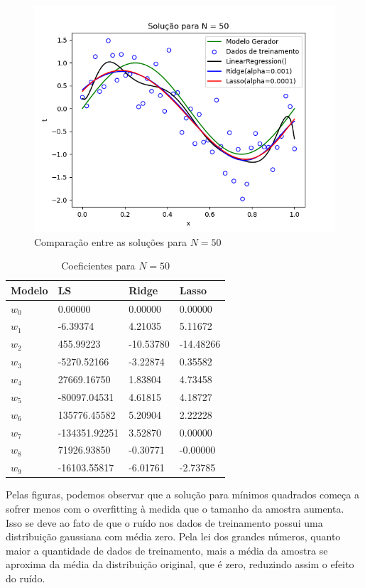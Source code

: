\begin{figure}[H]
    \centering
    \caption{Comparação entre as soluções para $N=50$}
    \includegraphics[width=12cm]{E1_f50.png}
\end{figure}

\begin{table}[H]
    \caption{Coeficientes para $N=50$}
    \centering
        \begin{tabular}{|l|lll|}
            \toprule
            Modelo & LS & Ridge & Lasso \\
            \midrule
            $w_0$ & 0.00000 & 0.00000 & 0.00000 \\
            $w_1$ & -6.39374 & 4.21035 & 5.11672 \\
            $w_2$ & 455.99223 & -10.53780 & -14.48266 \\
            $w_3$ & -5270.52166 & -3.22874 & 0.35582 \\
            $w_4$ & 27669.16750 & 1.83804 & 4.73458 \\
            $w_5$ & -80097.04531 & 4.61815 & 4.18727 \\
            $w_6$ & 135776.45582 & 5.20904 & 2.22228 \\
            $w_7$ & -134351.92251 & 3.52870 & 0.00000 \\
            $w_8$ & 71926.93850 & -0.30771 & -0.00000 \\
            $w_9$ & -16103.55817 & -6.01761 & -2.73785 \\
            \bottomrule
        \end{tabular}
\end{table}


Pelas figuras, podemos observar que a solução para mínimos quadrados começa a sofrer menos com o overfitting à medida que o tamanho da amostra aumenta. Isso se deve ao fato de que o ruído nos dados de treinamento possui uma distribuição gaussiana com média zero. Pela lei dos grandes números, quanto maior a quantidade de dados de treinamento, mais a média da amostra se aproxima da média da distribuição original, que é zero, reduzindo assim o efeito do ruído.

